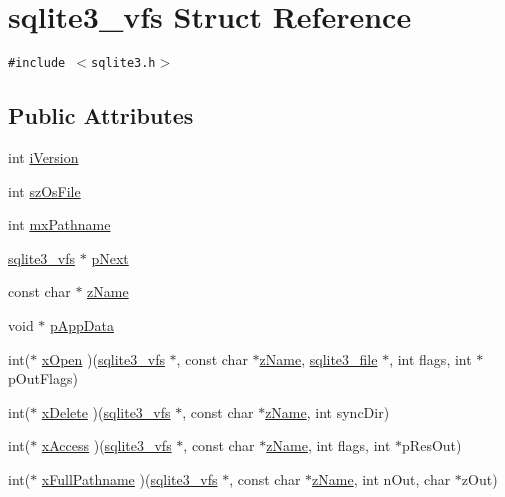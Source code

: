 \hypertarget{structsqlite3__vfs}{
\section{sqlite3\_\-vfs Struct Reference}
\label{structsqlite3__vfs}
}
{\tt \#include $<$sqlite3.h$>$}

\subsection*{Public Attributes}
\begin{CompactItemize}
\item 
int \hyperlink{structsqlite3__vfs_694dd264949bd163545fe174510ed019}{iVersion}
\item 
int \hyperlink{structsqlite3__vfs_549399081342d61134b6398562a0a997}{szOsFile}
\item 
int \hyperlink{structsqlite3__vfs_db2d82c74891b00b5529fb94e7710135}{mxPathname}
\item 
\hyperlink{structsqlite3__vfs}{sqlite3\_\-vfs} $\ast$ \hyperlink{structsqlite3__vfs_e795a4417697ecd35163f6cdf0069073}{pNext}
\item 
const char $\ast$ \hyperlink{structsqlite3__vfs_0f06a27ac2201ea04c0623ef19e5d73e}{zName}
\item 
void $\ast$ \hyperlink{structsqlite3__vfs_1ba832cf207fe59c1fc8eb436524bc35}{pAppData}
\item 
int($\ast$ \hyperlink{structsqlite3__vfs_5f35d5528d8fdf1d26e1e206879afbe1}{xOpen} )(\hyperlink{structsqlite3__vfs}{sqlite3\_\-vfs} $\ast$, const char $\ast$\hyperlink{structsqlite3__vfs_0f06a27ac2201ea04c0623ef19e5d73e}{zName}, \hyperlink{structsqlite3__file}{sqlite3\_\-file} $\ast$, int flags, int $\ast$pOutFlags)
\item 
int($\ast$ \hyperlink{structsqlite3__vfs_5f547a3e54f91c7ebef140d51054bbc0}{xDelete} )(\hyperlink{structsqlite3__vfs}{sqlite3\_\-vfs} $\ast$, const char $\ast$\hyperlink{structsqlite3__vfs_0f06a27ac2201ea04c0623ef19e5d73e}{zName}, int syncDir)
\item 
int($\ast$ \hyperlink{structsqlite3__vfs_b4344474034c2dbc9223a362c65ff235}{xAccess} )(\hyperlink{structsqlite3__vfs}{sqlite3\_\-vfs} $\ast$, const char $\ast$\hyperlink{structsqlite3__vfs_0f06a27ac2201ea04c0623ef19e5d73e}{zName}, int flags, int $\ast$pResOut)
\item 
int($\ast$ \hyperlink{structsqlite3__vfs_02fafc56d26adab5f236df6493a8bd55}{xFullPathname} )(\hyperlink{structsqlite3__vfs}{sqlite3\_\-vfs} $\ast$, const char $\ast$\hyperlink{structsqlite3__vfs_0f06a27ac2201ea04c0623ef19e5d73e}{zName}, int nOut, char $\ast$zOut)

\end{CompactItemize}
